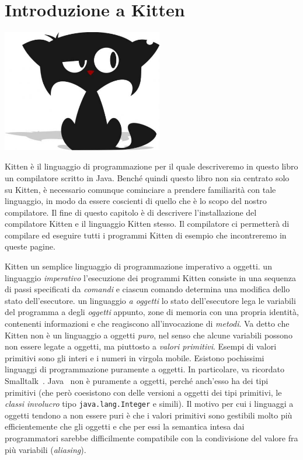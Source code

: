 \chapter{Introduzione a Kitten}\label{ch:kitten}
\begin{center}
\includegraphics[width=7cm]{cat4.jpg}
\end{center}
%
Kitten \`e il linguaggio di programmazione per il quale descriveremo in questo libro
un compilatore scritto in Java.
Bench\'e quindi questo libro non sia centrato solo su
Kitten, \`e necessario comunque cominciare a
prendere familiarit\`a con tale linguaggio, in modo da essere
coscienti di quello che \`e lo scopo del nostro compilatore.
Il fine di questo capitolo \`e di descrivere l'installazione del compilatore
Kitten e il linguaggio Kitten stesso. Il compilatore ci permetter\`a di
compilare ed eseguire tutti i programmi Kitten
di esempio che incontreremo in queste pagine.

Kitten \e un semplice linguaggio di programmazione imperativo a oggetti.
\E un linguaggio \emph{imperativo} \poiche
l'esecuzione dei programmi Kitten consiste in una sequenza di passi
specificati da \emph{comandi} e ciascun comando determina una modifica
dello stato dell'esecutore. \E un linguaggio \emph{a oggetti} \poiche
lo stato dell'esecutore lega le variabili del programma a degli \emph{oggetti}
appunto, \cioe zone di memoria con una propria identit\`a,
contenenti informazioni e che reagiscono
all'invocazione di \emph{metodi}. Va detto che Kitten non \`e un linguaggio
a oggetti \emph{puro}, nel senso che alcune variabili possono non essere legate
a oggetti, ma piuttosto a \emph{valori primitivi}. Esempi di valori primitivi
sono gli interi e i numeri in virgola mobile. Esistono pochissimi linguaggi di
programmazione puramente a oggetti. In particolare, va ricordato
Smalltalk~\cite{GoldbergR89}. Java~\cite{GoslingJSB05}
non \`e puramente a oggetti, perch\'e anch'esso ha dei tipi primitivi
(che per\`o coesistono con
delle versioni a oggetti dei tipi primitivi, \cioe le \emph{classi
involucro} tipo \texttt{java.lang.Integer} e simili).
Il motivo per cui i linguaggi a oggetti tendono a non essere puri
\`e che i valori primitivi sono gestibili molto pi\`u efficientemente
che gli oggetti e che per essi la semantica intesa dai programmatori
sarebbe difficilmente compatibile con la condivisione del valore fra pi\`u
variabili (\emph{aliasing}).

